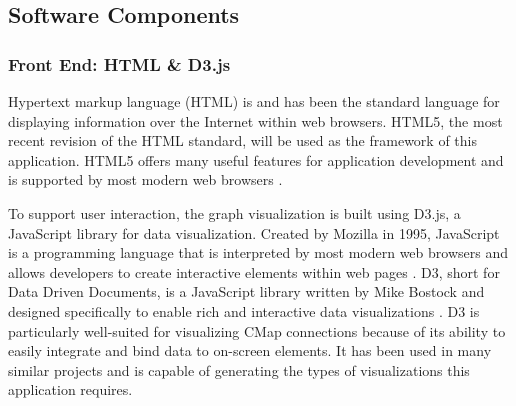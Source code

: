 \documentclass[12pt]{article}
\begin{document}



\subsection{Software Components}
\subsubsection{Front End: HTML \& D3.js}

Hypertext markup language (HTML) is and has been the standard language for displaying information over the Internet within web browsers. HTML5, the most recent revision of the HTML standard, will be used as the framework of this application. HTML5 offers many useful features for application development and is supported by most modern web browsers \cite{w3c_html5}. 

To support user interaction, the graph visualization is built using D3.js, a JavaScript library for data visualization. Created by Mozilla in 1995, JavaScript is a programming language that is interpreted by most modern web browsers and allows developers to create interactive elements within web pages \cite{mozilla_javascript}. D3, short for Data Driven Documents, is a JavaScript library written by Mike Bostock and designed specifically to enable rich and interactive data visualizations \cite{bostock_d3}. D3 is particularly well-suited for visualizing CMap connections because of its ability to easily integrate and bind data to on-screen elements. It has been used in many similar projects and is capable of generating the types of visualizations this application requires.
\end{document}
